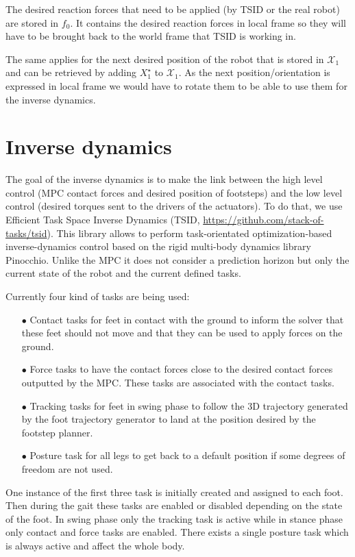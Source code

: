 \documentclass[a4paper,11pt]{article}
\begin{document}
The desired reaction forces that need to be applied (by TSID or the real robot) are stored in $f_0$. It contains the desired reaction forces in local frame so they will have to be brought back to the world frame that TSID is working in.

The same applies for the next desired position of the robot that is stored in $\mathcal{X}_1$ and can be retrieved by adding $X_1^\star$ to $\mathcal{X}_1$. As the next position/orientation is expressed in local frame we would have to rotate them to be able to use them for the inverse dynamics.

\section{Inverse dynamics}

The goal of the inverse dynamics is to make the link between the high level control (MPC contact forces and desired position of footsteps) and the low level control (desired torques sent to the drivers of the actuators). To do that, we use Efficient Task Space Inverse Dynamics (TSID, \url{https://github.com/stack-of-tasks/tsid}). This library allows to perform task-orientated optimization-based inverse-dynamics control based on the rigid multi-body dynamics library Pinocchio. Unlike the MPC it does not consider a prediction horizon but only the current state of the robot and the current defined tasks.

Currently four kind of tasks are being used:
\begin{itemize}
	\item[$\bullet$] Contact tasks for feet in contact with the ground to inform the solver that these feet should not move and that they can be used to apply forces on the ground.
	\item[$\bullet$] Force tasks to have the contact forces close to the desired contact forces outputted by the MPC. These tasks are associated with the contact tasks.
	\item[$\bullet$] Tracking tasks for feet in swing phase to follow the 3D trajectory generated by the foot trajectory generator to land at the position desired by the footstep planner.
	\item[$\bullet$] Posture task for all legs to get back to a default position if some degrees of freedom are not used.	
\end{itemize}

One instance of the first three task is initially created and assigned to each foot. Then during the gait these tasks are enabled or disabled depending on the state of the foot. In swing phase only the tracking task is active while in stance phase only contact and force tasks are enabled. There exists a single posture task which is always active and affect the whole body.
\end{document}
